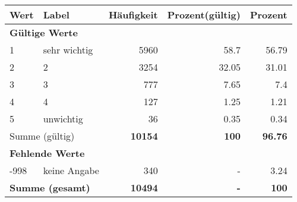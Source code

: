      \begin{longtable}{lXrrr}
     \toprule
     \textbf{Wert} & \textbf{Label} & \textbf{Häufigkeit} & \textbf{Prozent(gültig)} & \textbf{Prozent} \\
     \endhead
     \midrule
     \multicolumn{5}{l}{\textbf{Gültige Werte}}\\

     1 &
     \multicolumn{1}{X}{ sehr wichtig   } &


       \num{5960} &
       \num[round-mode=places,round-precision=2]{58.7} &
         \num[round-mode=places,round-precision=2]{56.79} \\

     2 &
     \multicolumn{1}{X}{ 2   } &


       \num{3254} &
       \num[round-mode=places,round-precision=2]{32.05} &
         \num[round-mode=places,round-precision=2]{31.01} \\

     3 &
     \multicolumn{1}{X}{ 3   } &


       \num{777} &
       \num[round-mode=places,round-precision=2]{7.65} &
         \num[round-mode=places,round-precision=2]{7.4} \\

     4 &
     \multicolumn{1}{X}{ 4   } &


       \num{127} &
       \num[round-mode=places,round-precision=2]{1.25} &
         \num[round-mode=places,round-precision=2]{1.21} \\

     5 &
     \multicolumn{1}{X}{ unwichtig   } &


       \num{36} &
       \num[round-mode=places,round-precision=2]{0.35} &
         \num[round-mode=places,round-precision=2]{0.34} \\
     \midrule
     \multicolumn{2}{l}{Summe (gültig)} &
       \textbf{\num{10154}} &
     \textbf{\num{100}} &
       \textbf{\num[round-mode=places,round-precision=2]{96.76}} \\
     \multicolumn{5}{l}{\textbf{Fehlende Werte}}\\
       -998 &
       keine Angabe &
         \num{340} &
        - &
         \num[round-mode=places,round-precision=2]{3.24} \\
     \midrule
     \multicolumn{2}{l}{\textbf{Summe (gesamt)}} &
          \textbf{\num{10494}} &
        \textbf{-} &
        \textbf{\num{100}} \\
     \bottomrule
     \end{longtable}
     
